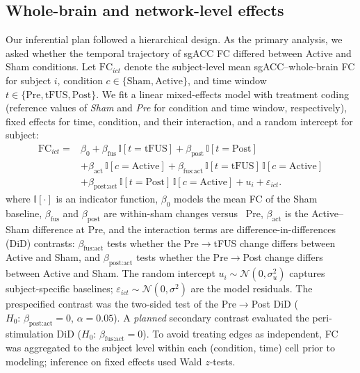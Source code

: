 \subsection*{Whole-brain and network-level effects}
\noindent
Our inferential plan followed a hierarchical design. As the primary analysis, we asked whether the temporal trajectory of sgACC FC differed between Active and Sham conditions. Let $\mathrm{FC}_{ict}$ denote the subject-level mean sgACC–whole-brain FC for subject $i$, condition $c\in\{\text{Sham},\text{Active}\}$, and time window $t\in\{\text{Pre},\text{tFUS},\text{Post}\}$. We fit a linear mixed-effects model with treatment coding (reference values of \emph{Sham} and \emph{Pre} for condition and time window, respectively), fixed effects for time, condition, and their interaction, and a random intercept for subject:
\begin{equation}
    \begin{aligned}
    \mathrm{FC}_{ict} = {}& \beta_0
      + \beta_{\text{fus}}\,\mathbb{I}[t=\text{tFUS}]
      + \beta_{\text{post}}\,\mathbb{I}[t=\text{Post}] \\
    & + \beta_{\text{act}}\,\mathbb{I}[c=\text{Active}]
      + \beta_{\text{fus:act}}\,\mathbb{I}[t=\text{tFUS}]\,\mathbb{I}[c=\text{Active}] \\
    & + \beta_{\text{post:act}}\,\mathbb{I}[t=\text{Post}]\,\mathbb{I}[c=\text{Active}]
      + u_i + \varepsilon_{ict}.
    \end{aligned}
    \end{equation}
where $\mathbb{I}[\cdot]$ is an indicator function, $\beta_0$ models the mean FC of the Sham baseline, $\beta_{\text{fus}}$ and $\beta_{\text{post}}$ are within-sham changes versus \ Pre, $\beta_{\text{act}}$ is the Active–Sham difference at Pre, and the interaction terms are difference-in-differences (DiD) contrasts: $\beta_{\text{fus:act}}$ tests whether the Pre$\rightarrow$tFUS change differs between Active and Sham, and $\beta_{\text{post:act}}$ tests whether the Pre$\rightarrow$Post change differs between Active and Sham. The random intercept $u_i\sim\mathcal{N}(0,\sigma_u^2)$ captures subject-specific baselines; $\varepsilon_{ict}\sim\mathcal{N}(0,\sigma^2)$ are the model residuals. The prespecified contrast was the two-sided test of the Pre$\rightarrow$Post DiD ($H_0\!:\,\beta_{\text{post:act}}=0$, $\alpha=0.05$). A \emph{planned} secondary contrast evaluated the peri-stimulation DiD ($H_0\!:\,\beta_{\text{fus:act}}=0$). To avoid treating edges as independent, FC was aggregated to the subject level within each (condition, time) cell prior to modeling; inference on fixed effects used Wald $z$-tests.

